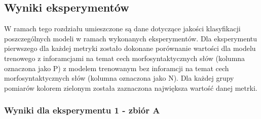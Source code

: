 \newpage %
\subsection{Wyniki eksperymentów} \label{wyniki_eksperymentow}

W ramach tego rozdziału umieszczone są dane dotyczące jakości klasyfikacji poszczególnych modeli w ramach wykonanych eksperymentów. Dla eksperymentu pierwszego dla każdej metryki zostało dokonane porównanie wartości dla modelu trenowego z inforamcjami na temat cech morfosyntaktycznych słów (kolumna oznaczona jako P) z modelem trenowanym bez inforamcji na temat cech morfosyntaktycznych słów (kolumna oznaczona jako N). Dla każdej grupy pomiarów kolorem zielonym została zaznaczona największa wartość danej metrki.

\newpage
\subsubsection{\label{wyniki_eksperymentow_eks_1}Wyniki dla eksperymentu 1 - zbiór A}


